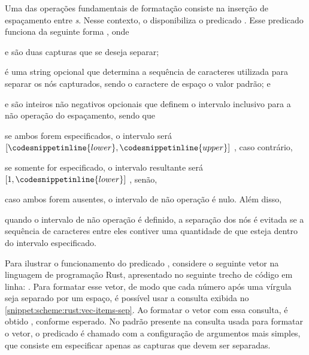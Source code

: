 \documentclass
  [11pt,a4paper,english,brazil,openright,sumario=tradicional,twoside]
  {abntex2}
\begin{document}
  Uma das operações fundamentais de formatação consiste na inserção de
  espaçamento entre \textit{s}. Nesse contexto, o \witchcooking
  disponibiliza o predicado . Esse predicado funciona
  da seguinte forma ,
  onde
  \begin{inparaenum}
    \item {} e  são duas capturas que
          se deseja separar;
    \item {} é uma string opcional que determina a
          sequência de caracteres utilizada para separar os nós capturados,
          sendo o caractere de espaço o valor padrão; e
    \item {} e  são inteiros
          não negativos opcionais que definem o intervalo inclusivo para a
          não operação do espaçamento, sendo que
          \begin{inparaenum}
            \item se ambos forem especificados, o intervalo será
                  $ \left
                      [ \codesnippetinline{lower},
                        \codesnippetinline{upper}\right]$%
                  , caso contrário,
            \item se somente  for especificado, o
                  intervalo resultante será
                  $\left[1, \codesnippetinline{lower}\right]$%
                  , senão,
            \item caso ambos forem ausentes, o intervalo de não operação é
                  nulo. Além disso,
            \item quando o intervalo de não operação é definido, a separação
                  dos nós é evitada se a sequência de caracteres entre eles
                  contiver uma quantidade de  que esteja
                  dentro do intervalo especificado.
          \end{inparaenum}
  \end{inparaenum}

  Para ilustrar o funcionamento do predicado ,
  considere o seguinte vetor na linguagem de programação Rust, apresentado no
  seguinte trecho de código em linha: \codesnippetinline[rust]{[0,1,   2,  3]}.
  Para formatar esse vetor, de modo que cada número após uma vírgula seja
  separado por um espaço, é possível usar a consulta exibida no
  \cref{snippet:scheme:rust:vec-items-sep}. Ao formatar o vetor com essa
  consulta, é obtido \codesnippetinline[rust]{[0, 1, 2, 3]}, conforme esperado.
  No padrão presente na consulta usada para formatar o vetor, o predicado
   é chamado com a configuração de argumentos mais
  simples, que consiste em especificar apenas as capturas que devem ser
  separadas.
\end{document}
